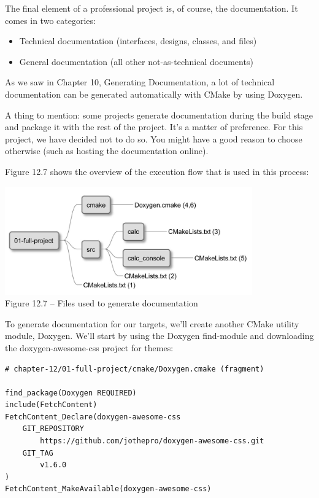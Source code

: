 
The final element of a professional project is, of course, the documentation. It comes in two categories:

\begin{itemize}
\item 
Technical documentation (interfaces, designs, classes, and files)

\item 
General documentation (all other not-as-technical documents)
\end{itemize}

As we saw in Chapter 10, Generating Documentation, a lot of technical documentation can be generated automatically with CMake by using Doxygen.


A thing to mention: some projects generate documentation during the build stage and package it with the rest of the project. It's a matter of preference. For this project, we have decided not to do so. You might have a good reason to choose otherwise (such as hosting the documentation online).

Figure 12.7 shows the overview of the execution flow that is used in this process:

\begin{center}
\includegraphics[width=0.8\textwidth]{content/3/chapter12/images/7.jpg}\\
Figure 12.7 – Files used to generate documentation
\end{center}

To generate documentation for our targets, we'll create another CMake utility module, Doxygen. We'll start by using the Doxygen find-module and downloading the doxygen-awesome-css project for themes:

\begin{lstlisting}[style=styleCMake]
# chapter-12/01-full-project/cmake/Doxygen.cmake (fragment)

find_package(Doxygen REQUIRED)
include(FetchContent)
FetchContent_Declare(doxygen-awesome-css
	GIT_REPOSITORY
		https://github.com/jothepro/doxygen-awesome-css.git
	GIT_TAG
		v1.6.0
)
FetchContent_MakeAvailable(doxygen-awesome-css)
\end{lstlisting}


